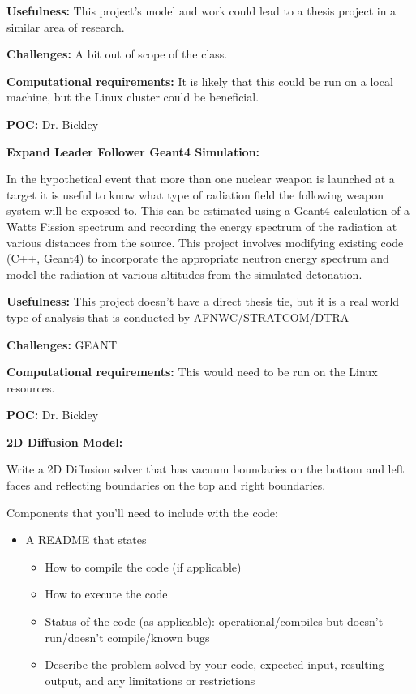 \documentclass[12pt, answers]{exam}
\begin{document}
\begin{questions}
\textbf{Usefulness:} 
This project's model and work could lead to a thesis project in a similar area of research.  

\textbf{Challenges:}
A bit out of scope of the class.

\textbf{Computational requirements:}
It is likely that this could be run on a local machine, but the Linux cluster could be beneficial.

\textbf{POC:} Dr. Bickley 

\newpage

\question \textbf{Expand Leader Follower Geant4 Simulation:}

In the hypothetical event that more than one nuclear weapon is launched at a target it is useful to know what type of radiation field the following weapon system will be exposed to.  This can be estimated using a Geant4 calculation of a Watts Fission spectrum and recording the energy spectrum of the radiation at various distances from the source.  This project involves modifying existing code (C++, Geant4) to incorporate the appropriate neutron energy spectrum and model the radiation at various altitudes from the simulated detonation.

\textbf{Usefulness:} 
This project doesn't have a direct thesis tie, but it is a real world type of analysis that is conducted by AFNWC/STRATCOM/DTRA

\textbf{Challenges:}
GEANT

\textbf{Computational requirements:}
This would need to be run on the Linux resources.

\textbf{POC:} Dr. Bickley 

\newpage

\question \textbf{2D Diffusion Model:}

Write a 2D Diffusion solver that has vacuum boundaries on the bottom and left faces and reflecting boundaries on the top and right boundaries. 

Components that you'll need to include with the code:
\begin{itemize}
\item A README that states
  \begin{itemize}
  \item How to compile the code (if applicable)
  \item How to execute the code
  \item Status of the code (as applicable): operational/compiles but doesn't run/doesn't compile/known bugs
  \item Describe the problem solved by your code, expected input, resulting output, and any limitations or restrictions
  \end{itemize}
  

\end{itemize}
\end{questions}
\end{document}
